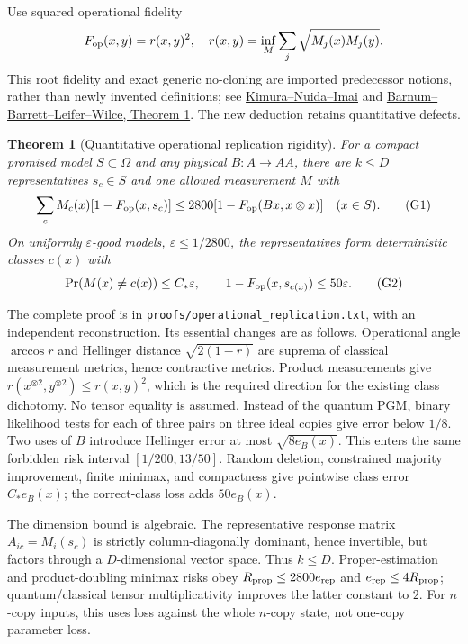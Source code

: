 \documentclass[11pt]{article}
\newtheorem{theorem}{Theorem}
\begin{document}
Use squared operational fidelity
\[
F_{\rm op}(x,y)=r(x,y)^2,\quad
r(x,y)=\inf_M\sum_j\sqrt{M_j(x)M_j(y)}.
\]
This root fidelity and exact generic no-cloning are imported predecessor notions, rather than newly invented definitions; see \href{https://arxiv.org/abs/0910.0994}{Kimura--Nuida--Imai} and \href{https://arxiv.org/html/quant-ph/0611295}{Barnum--Barrett--Leifer--Wilce, Theorem 1}. The new deduction retains quantitative defects.

\begin{theorem}[Quantitative operational replication rigidity]
For a compact promised model $S\subset\Omega$ and any physical $B:A\to AA$, there are $k\le D$ representatives $s_c\in S$ and one allowed measurement $M$ with
\[
\sum_c M_c(x)[1-F_{\rm op}(x,s_c)]
\le2800[1-F_{\rm op}(Bx,x\otimes x)]\quad(x\in S).
\tag{G1}
\]
On uniformly $\varepsilon$-good models, $\varepsilon\le1/2800$, the representatives form deterministic classes $c(x)$ with
\[
\Pr(M(x)\ne c(x))\le C_*\varepsilon,\qquad
1-F_{\rm op}(x,s_{c(x)})\le50\varepsilon.
\tag{G2}
\]
\end{theorem}

The complete proof is in \texttt{proofs/operational\_replication.txt}, with an independent reconstruction. Its essential changes are as follows. Operational angle $\arccos r$ and Hellinger distance $\sqrt{2(1-r)}$ are suprema of classical measurement metrics, hence contractive metrics. Product measurements give $r(x^{\otimes2},y^{\otimes2})\le r(x,y)^2$, which is the required direction for the existing class dichotomy. No tensor equality is assumed. Instead of the quantum PGM, binary likelihood tests for each of three pairs on three ideal copies give error below $1/8$. Two uses of $B$ introduce Hellinger error at most $\sqrt{8e_B(x)}$. This enters the same forbidden risk interval $[1/200,13/50]$. Random deletion, constrained majority improvement, finite minimax, and compactness give pointwise class error $C_*e_B(x)$; the correct-class loss adds $50e_B(x)$.

The dimension bound is algebraic. The representative response matrix $A_{ic}=M_i(s_c)$ is strictly column-diagonally dominant, hence invertible, but factors through a $D$-dimensional vector space. Thus $k\le D$. Proper-estimation and product-doubling minimax risks obey $R_{\rm prop}\le2800e_{\rm rep}$ and $e_{\rm rep}\le4R_{\rm prop}$; quantum/classical tensor multiplicativity improves the latter constant to $2$. For $n$-copy inputs, this uses loss against the whole $n$-copy state, not one-copy parameter loss.
\end{document}
